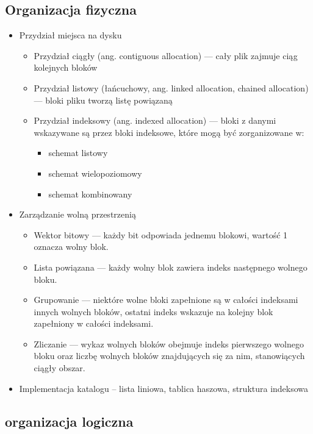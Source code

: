\documentclass[12pt]{article}
\begin{document}
    \subsection{Organizacja fizyczna}
    \begin{itemize}
        \item Przydział miejsca na dysku
        \begin{itemize}
            \item Przydział ciągły (ang. contiguous allocation) — cały plik zajmuje ciąg kolejnych bloków
            \item Przydział listowy (łańcuchowy, ang. linked allocation, chained allocation) — bloki pliku tworzą listę powiązaną
            \item Przydział indeksowy (ang. indexed allocation) — bloki z danymi wskazywane są przez bloki indeksowe, które mogą być
            zorganizowane w:
            \begin{itemize}
                \item schemat listowy
                \item schemat wielopoziomowy
                \item schemat kombinowany
            \end{itemize}
        \end{itemize}
        \item Zarządzanie wolną przestrzenią
        \begin{itemize}
            \item Wektor bitowy — każdy bit odpowiada jednemu blokowi, wartość 1 oznacza wolny blok.
            \item Lista powiązana — każdy wolny blok zawiera indeks następnego wolnego bloku.
            \item Grupowanie — niektóre wolne bloki zapełnione są w całości indeksami innych wolnych bloków, ostatni indeks wskazuje na
                kolejny blok zapełniony w całości indeksami.
            \item Zliczanie — wykaz wolnych bloków obejmuje indeks pierwszego wolnego bloku oraz liczbę wolnych bloków znajdujących się za
                nim, stanowiących ciągły obszar.
        \end{itemize}
        \item Implementacja katalogu – lista liniowa, tablica haszowa, struktura indeksowa
    \end{itemize}
    
    \subsection{organizacja logiczna}
\end{document}
